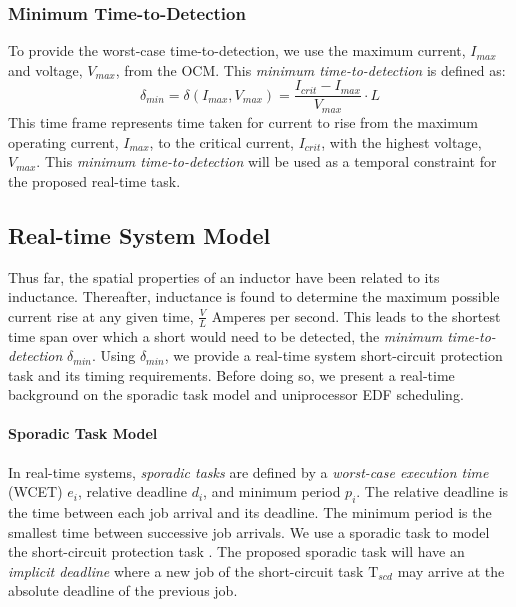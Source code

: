 \subsubsection{Minimum Time-to-Detection}
To provide the worst-case time-to-detection, we use the maximum current, $I_{max}$ and voltage, $V_{max}$, from the OCM. This \textit{minimum time-to-detection} is defined as:
\begin{equation}\label{eq:MinTimeToDetect}
\delta_{min} = \delta(I_{max},V_{max}) = \frac{I_{crit}-I_{max}}{V_{max}}\cdot L
\end{equation}
This time frame represents time taken for current to rise from the maximum operating current, $I_{max}$, to the critical current, $I_{crit}$, with the highest voltage, $V_{max}$. This \textit{minimum time-to-detection} will be used as a temporal constraint for the proposed real-time task.
\clearpage \subsection{Real-time System Model}\label{subsec:real-time system model}
Thus far, the spatial properties of an inductor have been related to its inductance. Thereafter, inductance is found to determine the maximum possible current rise at any given time, $\frac{V}{L}$ Amperes per second. This leads to the shortest time span over which a short would need to be detected, the \textit{minimum time-to-detection} $\delta_{min}$. Using $\delta_{min}$, we provide a real-time system short-circuit protection task and its timing requirements. Before doing so, we present a real-time background on the sporadic task model and uniprocessor EDF scheduling.

\paragraph{Sporadic Task Model}
In real-time systems, \textit{sporadic tasks} are defined by a \textit{worst-case execution time} (WCET) $e_{i}$, relative deadline $d_{i}$, and minimum period $p_{i}$. The relative deadline is the time between each job arrival and its deadline. The minimum period is the smallest time between successive job arrivals. We use a sporadic task to model the short-circuit protection task \cite{sporadicTaskModel}. The proposed sporadic task will have an \textit{implicit deadline} where a new job of the short-circuit task $\mathrm{T}_{scd}$ may arrive at the absolute deadline of the previous job.

